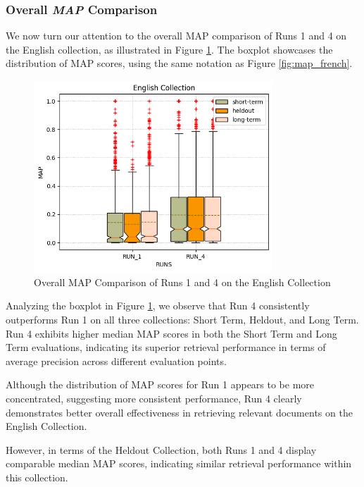 \subsubsection{Overall \textit{MAP} Comparison} \label{sec:map_comparison_eng}

We now turn our attention to the overall \ac{MAP} comparison of Runs 1 and 4 on the English collection, as illustrated in Figure \ref{fig:map_english}. 
The boxplot showcases the distribution of \ac{MAP} scores, using the same notation as Figure \ref{fig:map_french}.

\begin{figure}[!h]
\centering
\includegraphics[width=0.8\textwidth]{figure/StatisticalAnalysis/BoxPlot/MAP English.png}
\caption{Overall \ac{MAP} Comparison of Runs 1 and 4 on the English Collection}
\label{fig:map_english}
\end{figure}

Analyzing the boxplot in Figure \ref{fig:map_english}, we observe that Run 4 consistently outperforms Run 1 on all three collections: Short Term, Heldout, and Long Term. 
Run 4 exhibits higher median \ac{MAP} scores in both the Short Term and Long Term evaluations, indicating its superior retrieval performance in terms of average precision across different evaluation points.

Although the distribution of \ac{MAP} scores for Run 1 appears to be more concentrated, suggesting more consistent performance, Run 4 clearly demonstrates better overall effectiveness in retrieving relevant documents on the English Collection.

However, in terms of the Heldout Collection, both Runs 1 and 4 display comparable median \ac{MAP} scores, indicating similar retrieval performance within this collection. 

